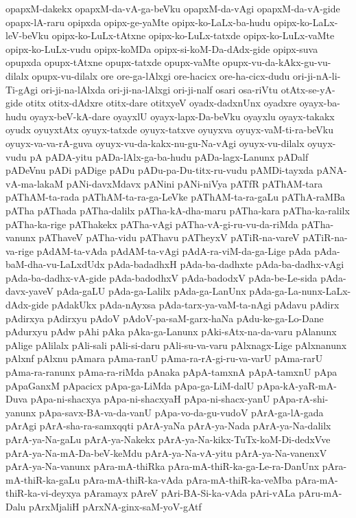 {opapxM-dakekx
opapxM-da-vA-ga-beVku
opapxM-da-vAgi
opapxM-da-vA-gide
opapx-lA-raru
opipxda
opipx-ge-yaMte
opipx-ko-LaLx-ba-hudu
opipx-ko-LaLx-leV-beVku
opipx-ko-LuLx-tAtxne
opipx-ko-LuLx-tatxde
opipx-ko-LuLx-vaMte
opipx-ko-LuLx-vudu
opipx-koMDa
opipx-si-koM-Da-dAdx-gide
opipx-suva
opupxda
opupx-tAtxne
opupx-tatxde
opupx-vaMte
opupx-vu-da-kAkx-gu-vu-dilalx
opupx-vu-dilalx
ore
ore-ga-lAlxgi
ore-hacicx
ore-ha-cicx-dudu
ori-ji-nA-li-Ti-gAgi
ori-ji-na-lAlxda
ori-ji-na-lAlxgi
ori-ji-nalf
osari
osa-riVtu
otAtx-se-yA-gide
otitx
otitx-dAdxre
otitx-dare
otitxyeV
oyadx-dadxnUnx
oyadxre
oyayx-ba-hudu
oyayx-beV-kA-dare
oyayxlU
oyayx-lapx-Da-beVku
oyayxlu
oyayx-takakx
oyudx
oyuyxtAtx
oyuyx-tatxde
oyuyx-tatxve
oyuyxva
oyuyx-vaM-ti-ra-beVku
oyuyx-va-va-rA-guva
oyuyx-vu-da-kakx-nu-gu-Na-vAgi
oyuyx-vu-dilalx
oyuyx-vudu
pA
pADA-yitu
pADa-lAlx-ga-ba-hudu
pADa-lagx-Lanunx
pADalf
pADeVnu
pADi
pADige
pADu
pADu-pa-Du-titx-ru-vudu
pAMDi-tayxda
pANA-vA-ma-lakaM
pANi-davxMdavx
pANini
pANi-niVya
pATfR
pAThAM-tara
pAThAM-ta-rada
pAThAM-ta-ra-ga-LeVke
pAThAM-ta-ra-gaLu
pAThA-raMBa
pATha
pAThada
pATha-dalilx
pATha-kA-dha-maru
pATha-kara
pATha-ka-ralilx
pATha-ka-rige
pAThakekx
pATha-vAgi
pATha-vA-gi-ru-vu-da-riMda
pATha-vanunx
pAThaveV
pATha-vidu
pAThavu
pATheyxV
pATiR-na-vareV
pATiR-na-va-rige
pAdAM-ta-vAda
pAdAM-ta-vAgi
pAdA-ra-viM-da-ga-Lige
pAda
pAda-baM-dha-vu-LaLxdUdx
pAda-badadhxH
pAda-ba-dadhxte
pAda-ba-dadhx-vAgi
pAda-ba-dadhx-vA-gide
pAda-badodhxV
pAda-badodxV
pAda-be-Le-sida
pAda-davx-yaveV
pAda-gaLU
pAda-ga-Lalilx
pAda-ga-LanUnx
pAda-ga-La-nunx-LaLx-dAdx-gide
pAdakUkx
pAda-nAyxsa
pAda-tarx-ya-vaM-ta-nAgi
pAdavu
pAdirx
pAdirxya
pAdirxyu
pAdoV
pAdoV-pa-saM-garx-haNa
pAdu-ke-ga-Lo-Dane
pAdurxyu
pAdw
pAhi
pAka
pAka-ga-Lanunx
pAki-sAtx-na-da-varu
pAlanunx
pAlige
pAlilalx
pAli-sali
pAli-si-daru
pAli-su-va-varu
pAlxnagx-Lige
pAlxnanunx
pAlxnf
pAlxnu
pAmara
pAma-ranU
pAma-ra-rA-gi-ru-va-varU
pAma-rarU
pAma-ra-ranunx
pAma-ra-riMda
pAnaka
pApA-tamxnA
pApA-tamxnU
pApa
pApaGanxM
pApacicx
pApa-ga-LiMda
pApa-ga-LiM-dalU
pApa-kA-yaR-mA-Duva
pApa-ni-shacxya
pApa-ni-shacxyaH
pApa-ni-shacx-yanU
pApa-rA-shi-yanunx
pApa-savx-BA-va-da-vanU
pApa-vo-da-gu-vudoV
pArA-ga-lA-gada
pArAgi
pArA-sha-ra-samxqqti
pArA-yaNa
pArA-ya-Nada
pArA-ya-Na-dalilx
pArA-ya-Na-gaLu
pArA-ya-Nakekx
pArA-ya-Na-kikx-TuTx-koM-Di-dedxVve
pArA-ya-Na-mA-Da-beV-keMdu
pArA-ya-Na-vA-yitu
pArA-ya-Na-vanenxV
pArA-ya-Na-vanunx
pAra-mA-thiRka
pAra-mA-thiR-ka-ga-Le-ra-DanUnx
pAra-mA-thiR-ka-gaLu
pAra-mA-thiR-ka-vAda
pAra-mA-thiR-ka-veMba
pAra-mA-thiR-ka-vi-deyxya
pAramayx
pAreV
pAri-BA-Si-ka-vAda
pAri-vALa
pAru-mA-Dalu
pArxMjaliH
pArxNA-ginx-saM-yoV-gAtf
}
